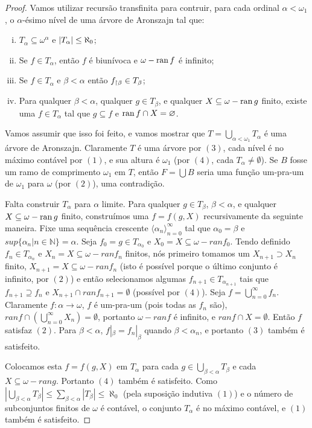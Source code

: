 \documentclass[a4paper]{article}
\begin{document}
\begin{proof}
  Vamos utilizar recursão transfinita para contruir, para cada ordinal \(\alpha
  <\omega_1\), o \(\alpha\)-ésimo nível de uma árvore de Aronszajn tal que:
  \begin{enumerate}[(i)]
      \item \(T_{\alpha} \subseteq \omega^{\alpha}\) e \(\vert T_{\alpha} \vert \le \aleph_0\);
      \item Se \(f \in T_{\alpha}\), então \(f\) é biunívoca e \(\omega - \operatorname{ran} f\) é infinito;
      \item Se \(f \in T_{\alpha}\) e \(\beta < \alpha\) então \(f_{\upharpoonright \beta} \in T_{\beta}\);
      \item Para qualquer \(\beta < \alpha\), qualquer \(g \in T_{\beta}\), e
        qualquer \(X \subseteq \omega - \operatorname{ran} g\) finito, existe uma \(f \in
        T_{\alpha}\) tal que $g \subseteq f$ e \(\operatorname{ran} f \cap X = \varnothing\).
      \end{enumerate}
      
  Vamos assumir que isso foi feito, e vamos mostrar que $T = \bigcup_{\alpha < \omega_1}T_{\alpha}$ é uma árvore de Aronszajn. Claramente $T$ é uma árvore por $(3)$, cada nível é no máximo contável por $(1)$, e sua altura é $\omega_1$ (por $(4)$, cada $T_{\alpha} \neq \emptyset$). Se $B$ fosse um ramo de comprimento $\omega_1$ em $T$, então $F = \bigcup B$ seria uma função um-pra-um de $\omega_1$ para $\omega$ (por $(2)$), uma contradição.
  
  Falta construir $T_{\alpha}$ para $\alpha$ limite. Para qualquer $g \in
  T_{\beta}$, $\beta < \alpha$, e qualquer \(X \subseteq \omega - \operatorname{ran} g\) finito, construímos uma $f = f(g, X)$ recursivamente da seguinte maneira. Fixe uma sequência crescente $\langle \alpha_n \rangle_{n=0}^{\infty}$ tal que $\alpha_0 = \beta$ e $sup\{\alpha_n | n \in \mathbb{N}\} = \alpha$. Seja $f_0 = g \in T_{\alpha_0}$ e $X_0 = X \subseteq \omega - ranf_0$. Tendo definido $f_n \in T_{\alpha_n}$ e $X_n = X \subseteq \omega - ranf_n$ finitos, nós primeiro tomamos um $X_{n+1} \supset X_n$ finito, $X_{n+1} = X \subseteq \omega - ranf_n$ (isto é possível porque o último conjunto é infinito, por $(2)$) e então selecionamos algumas $f_{n+1} \in T_{\alpha_{n+1}}$ tais que $f_{n+1} \supseteq f_n$ e $X_{n+1} \cap ranf_{n+1} = \emptyset$ (possível por $(4)$). Seja $f = \bigcup_{n = 0}^{\infty}f_n$. Claramente $f: \alpha \rightarrow \omega$, $f$ é um-pra-um (pois todas as $f_n$ são), $ranf \cap (\bigcup_{n = 0}^{\infty} X_n) = \emptyset$, portanto $\omega - ranf$ é infinito, e $ranf \cap X = \emptyset$. Então $f$ satisfaz $(2)$. Para $\beta < \alpha$, $f |_{\beta} = f_{n} |_{\beta}$ quando $\beta < \alpha_n$, e portanto $(3)$ também é satisfeito.
  
  Colocamos esta $f = f(g, X)$ em $T_{\alpha}$ para cada $g \in \bigcup_{\beta < \alpha} T_{\beta}$ e cada $X \subseteq \omega - rang$. Portanto $(4)$ também é satisfeito. Como $|\bigcup_{\beta<\alpha}T_{\beta}| \le \sum_{\beta<\alpha}|T_{\beta}| \le \aleph_0$ (pela suposição indutiva $(1)$) e o número de subconjuntos finitos de $\omega$ é contável, o conjunto $T_{\alpha}$ é no máximo contável, e $(1)$ também é satisfeito.
\end{proof}
\end{document}
